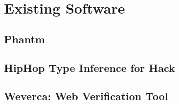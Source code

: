 \chapter{Existing Software}
    \section{Phantm\cite{kneuss2010using}}
    
    \section{HipHop Type Inference for Hack}
    
    \section{Weverca: Web Verification Tool\cite{hauzarhunting}}